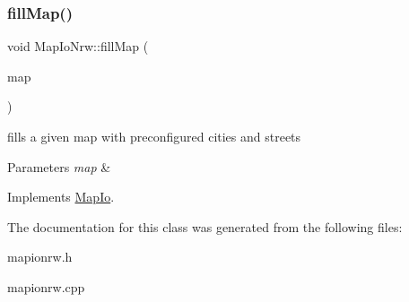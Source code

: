 \subsubsection{\texorpdfstring{fill\+Map()}{fillMap()}}
{\footnotesize\ttfamily void Map\+Io\+Nrw\+::fill\+Map (\begin{DoxyParamCaption}\item[{\hyperlink{class_abstract_map}{Abstract\+Map} \&}]{map }\end{DoxyParamCaption})\hspace{0.3cm}{\ttfamily [virtual]}}



fills a given map with preconfigured cities and streets 


\begin{DoxyParams}{Parameters}
{\em map} & \\
\hline
\end{DoxyParams}


Implements \hyperlink{class_map_io_af33256d5aeeb5e36d26660da24bc8ec9}{Map\+Io}.



The documentation for this class was generated from the following files\+:\begin{DoxyCompactItemize}
\item 
mapionrw.\+h\item 
mapionrw.\+cpp\end{DoxyCompactItemize}
